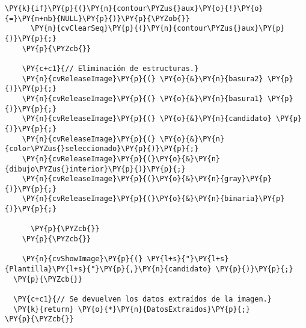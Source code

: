 \begin{Verbatim}[commandchars=\\\{\}]
	\PY{k}{if}\PY{p}{(}\PY{n}{contour\PYZus{}aux}\PY{o}{!}\PY{o}{=}\PY{n+nb}{NULL}\PY{p}{)}\PY{p}{\PYZob{}}
	  \PY{n}{cvClearSeq}\PY{p}{(}\PY{n}{contour\PYZus{}aux}\PY{p}{)}\PY{p}{;}
	\PY{p}{\PYZcb{}}
	
	\PY{c+c1}{// Eliminación de estructuras.}
	\PY{n}{cvReleaseImage}\PY{p}{(} \PY{o}{&}\PY{n}{basura2} \PY{p}{)}\PY{p}{;}
	\PY{n}{cvReleaseImage}\PY{p}{(} \PY{o}{&}\PY{n}{basura1} \PY{p}{)}\PY{p}{;}
	\PY{n}{cvReleaseImage}\PY{p}{(} \PY{o}{&}\PY{n}{candidato} \PY{p}{)}\PY{p}{;}
	\PY{n}{cvReleaseImage}\PY{p}{(} \PY{o}{&}\PY{n}{color\PYZus{}seleccionado}\PY{p}{)}\PY{p}{;} 
	\PY{n}{cvReleaseImage}\PY{p}{(}\PY{o}{&}\PY{n}{dibujo\PYZus{}interior}\PY{p}{)}\PY{p}{;}
	\PY{n}{cvReleaseImage}\PY{p}{(}\PY{o}{&}\PY{n}{gray}\PY{p}{)}\PY{p}{;}
	\PY{n}{cvReleaseImage}\PY{p}{(}\PY{o}{&}\PY{n}{binaria}\PY{p}{)}\PY{p}{;}
	
      \PY{p}{\PYZcb{}}
    \PY{p}{\PYZcb{}}
    
    \PY{n}{cvShowImage}\PY{p}{(} \PY{l+s}{"}\PY{l+s}{Plantilla}\PY{l+s}{"}\PY{p}{,}\PY{n}{candidato} \PY{p}{)}\PY{p}{;}
  \PY{p}{\PYZcb{}}
  
  \PY{c+c1}{// Se devuelven los datos extraídos de la imagen.}
  \PY{k}{return} \PY{o}{*}\PY{n}{DatosExtraidos}\PY{p}{;}
\PY{p}{\PYZcb{}}
\end{Verbatim}
